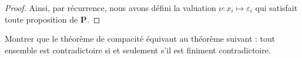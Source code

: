 \begin{proof}
    Ainsi, par récurrence, nous avons défini la valuation $\nu : x_i \mapsto \varepsilon_i$ qui satisfait toute proposition de $\mathbf P$.
\end{proof}

\begin{exo}
    Montrer que le théorème de compacité équivaut au théorème suivant : tout ensemble est contradictoire si et seulement s'il est finiment contradictoire.
\end{exo}
